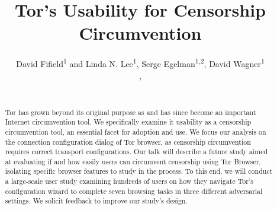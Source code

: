 \documentclass{template}
\begin{document}
\title{Tor's Usability for Censorship Circumvention}
\author{
 \alignauthor David Fifield\textsuperscript{1} and Linda N. Lee\textsuperscript{1}, Serge Egelman\textsuperscript{1,2}, David Wagner\textsuperscript{1}\\
   \vspace{0.5em}
   , \\
   \\
}
\maketitle

\begin{abstract}
{\color{red}
Tor has grown beyond its original purpose as and has 
since become an important Internet circumvention tool.
We specifically examine it usability as a censorship circumvention tool,
an essential facet for adoption and use.  
We focus our analysis on the connection configuration dialog of Tor browser,
as censorship circumvention requires correct transport configurations.
Our talk will describe a future study aimed at evaluating 
if and how easily users can circumvent censorship using Tor Browser,
isolating specific browser features to study in the process. 
To this end, we will conduct a large-scale user study examining hundreds of users 
on how they navigate Tor's configuration wizard to complete seven browsing tasks 
in three different adversarial settings. 
We solicit feedback to improve our study's design.}
\end{abstract}

\end{document}
